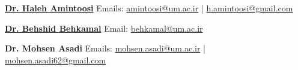 \documentclass[11pt,a4paper,sans]{moderncv}        %
\begin{document}
\cvitem{} {\href{http://amintoosi.profcms.um.ac.ir}{\textbf{Dr. Haleh Amintoosi}}}
\cvitem{} {Emails: \href{mailto:amintoosi@um.ac.ir}{amintoosi@um.ac.ir} | \href{mailto:h.amintoosi@gmail.com}{h.amintoosi@gmail.com} }

\cvitem{} {\href{http://behkamal.profcms.um.ac.ir}{\textbf{Dr. Behshid Behkamal}}}
\cvitem{} {Email: \href{mailto:behkamal@um.ac.ir}{behkamal@um.ac.ir}}

\cvitem{} {\textbf{Dr. Mohsen Asadi}}
\cvitem{} {Emails: \href{mailto:mohsen.asadi@um.ac.ir}{mohsen.asadi@um.ac.ir} | \href{mailto:mohsen.asadi62@gmail.com}{mohsen.asadi62@gmail.com}}
\end{document}

